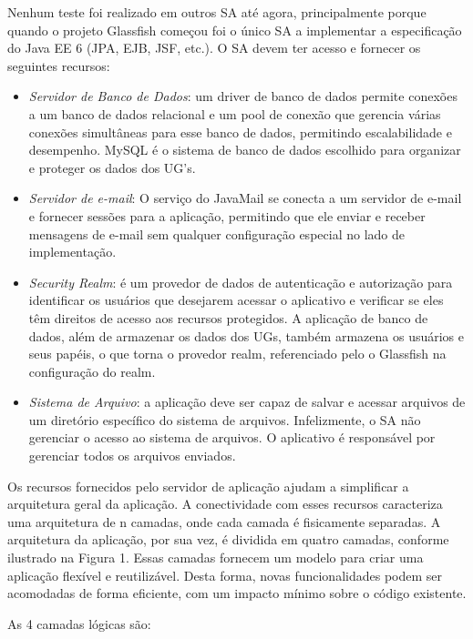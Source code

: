 \documentclass[envcountsame,envcountchap,letterpaper]{svmono}
\begin{document}
Nenhum teste foi realizado em outros SA até agora, principalmente porque quando o projeto Glassfish começou foi o único SA a implementar a especificação do Java EE 6 (JPA, EJB, JSF, etc.). O SA devem ter acesso e fornecer os seguintes recursos:

\begin{itemize}
\item \textit{Servidor de Banco de Dados}: um driver de banco de dados permite conexões a um banco de dados relacional e um pool de conexão que gerencia várias conexões simultâneas para esse banco de dados, permitindo escalabilidade e desempenho. MySQL é o sistema de banco de dados escolhido para organizar e proteger os dados dos UG's.

\item \textit{Servidor de e-mail}: O serviço do JavaMail se conecta a um servidor de e-mail e fornecer sessões para a aplicação, permitindo que ele enviar e receber mensagens de e-mail sem qualquer configuração especial no lado de implementação.

\item \textit{Security Realm}: é um provedor de dados de autenticação e autorização para identificar os usuários que desejarem acessar o aplicativo e verificar se eles têm direitos de acesso aos recursos protegidos. A aplicação de banco de dados, além de armazenar os dados dos UGs, também armazena os usuários e seus papéis, o que torna o provedor realm, referenciado pelo o Glassfish na configuração do realm.

\item \textit{Sistema de Arquivo}: a aplicação deve ser capaz de salvar e acessar arquivos de um diretório específico do sistema de arquivos. Infelizmente, o SA não gerenciar o acesso ao sistema de arquivos. O aplicativo é responsável por gerenciar todos os arquivos enviados.
\end{itemize}

Os recursos fornecidos pelo servidor de aplicação ajudam a simplificar a arquitetura geral da aplicação. A conectividade com esses recursos caracteriza uma arquitetura de n camadas, onde cada camada é fisicamente separadas. A arquitetura da aplicação, por sua vez, é dividida em quatro camadas, conforme ilustrado na Figura 1. Essas camadas fornecem um modelo para criar uma aplicação flexível e reutilizável. Desta forma, novas funcionalidades podem ser acomodadas de forma eficiente, com um impacto mínimo sobre o código existente.

As 4 camadas lógicas são:
\end{document}
